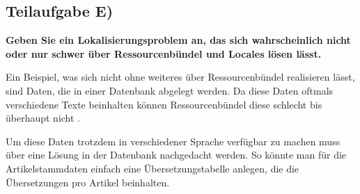 \subsection{Teilaufgabe E)}
\textbf{Geben Sie ein Lokalisierungsproblem an, das sich wahrscheinlich nicht oder nur schwer
über Ressourcenbündel und Locales lösen lässt.}

Ein Beispiel, was sich nicht ohne weiteres über Ressourcenbündel realisieren
lässt, sind Daten, die in einer Datenbank abgelegt werden. Da diese Daten
oftmals verschiedene Texte beinhalten können Ressourcenbündel diese schlecht bis
überhaupt nicht . 

Um diese Daten trotzdem in verschiedener Sprache verfügbar zu machen muss über
eine Lösung in der Datenbank nachgedacht werden. So könnte man \zB
für die Artikelstammdaten einfach eine Übersetzungstabelle anlegen, die die
Übersetzungen pro Artikel beinhalten.

\clearpage